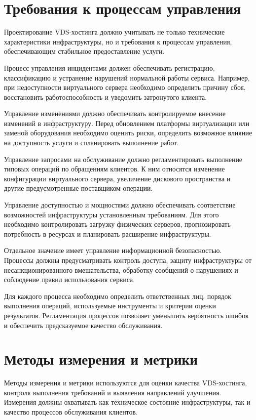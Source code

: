 \documentclass[14pt,a4paper]{extarticle}
\begin{document}
\section{Требования к процессам управления}

Проектирование VDS-хостинга должно учитывать не только технические характеристики инфраструктуры, но и требования к процессам управления, обеспечивающим стабильное предоставление услуги.

Процесс управления инцидентами должен обеспечивать регистрацию, классификацию и устранение нарушений нормальной работы сервиса. Например, при недоступности виртуального сервера необходимо определить причину сбоя, восстановить работоспособность и уведомить затронутого клиента.

Управление изменениями должно обеспечивать контролируемое внесение изменений в инфраструктуру. Перед обновлением платформы виртуализации или заменой оборудования необходимо оценить риски, определить возможное влияние на доступность услуги и спланировать выполнение работ.

Управление запросами на обслуживание должно регламентировать выполнение типовых операций по обращениям клиентов. К ним относятся изменение конфигурации виртуального сервера, увеличение дискового пространства и другие предусмотренные поставщиком операции.

Управление доступностью и мощностями должно обеспечивать соответствие возможностей инфраструктуры установленным требованиям. Для этого необходимо контролировать загрузку физических серверов, прогнозировать потребность в ресурсах и планировать расширение инфраструктуры.

Отдельное значение имеет управление информационной безопасностью. Процессы должны предусматривать контроль доступа, защиту инфраструктуры от несанкционированного вмешательства, обработку сообщений о нарушениях и соблюдение правил использования сервиса.

Для каждого процесса необходимо определить ответственных лиц, порядок выполнения операций, используемые инструменты и критерии оценки результатов. Регламентация процессов позволяет уменьшить вероятность ошибок и обеспечить предсказуемое качество обслуживания.

\section{Методы измерения и метрики}

Методы измерения и метрики используются для оценки качества VDS-хостинга, контроля выполнения требований и выявления направлений улучшения. Измерения должны охватывать как техническое состояние инфраструктуры, так и качество процессов обслуживания клиентов.
\end{document}
